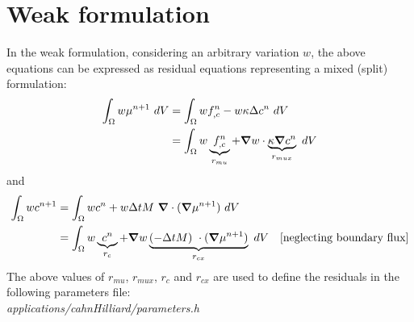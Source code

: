 \documentclass[10pt]{article}
\newcommand{\gv}[1]{\ensuremath{\mbox{\boldmath$ #1 $}}}
\newcommand{\grad}[1]{\gv{\nabla} #1}
\begin{document}
\section{Weak formulation}
In the weak formulation, considering an arbitrary variation $w$, the above equations can be expressed as residual equations representing a mixed (split) formulation:
\begin{align}
  \int_{\Omega}   w  \mu^{n+1}  ~dV &= \int_{\Omega}  w  f_{,c}^{n} - w \kappa \Delta c^{n}~dV\\
  &=\int_{\Omega}  w  \underbrace{f_{,c}^{n}}_{r_{mu}} + \grad w \cdot \underbrace{\kappa \grad c^{n}}_{r_{mux}} ~dV 
\end{align}
and 
\begin{align}
\int_{\Omega}   w c^{n+1} &= \int_{\Omega}   w c^{n} + w \Delta t M~\grad \cdot (\grad \mu^{n+1}) ~dV \\
&= \int_{\Omega}   w \underbrace{ c^{n}}_{r_{c}} + \grad w \underbrace{ (-\Delta t M)~ \cdot (\grad \mu^{n+1})}_{r_{c x}} ~dV \quad \text{[neglecting boundary flux]} 
\end{align}
\vskip 0.25in
The above values of $r_{mu}$, $r_{mux}$, $r_{c}$ and $r_{cx}$ are used to define the residuals in the following parameters file: \\
\textit{applications/cahnHilliard/parameters.h}
\end{document}
